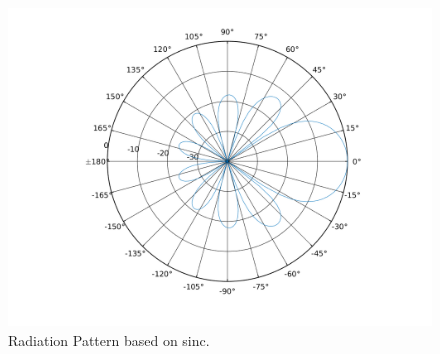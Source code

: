 \begin{figure}[H]
	\centering
	\includegraphics[scale=0.4]{figures/radiationpattern.png}
	\caption{Radiation Pattern based on sinc.}
	\label{fig:radiationpattern}
\end{figure}
